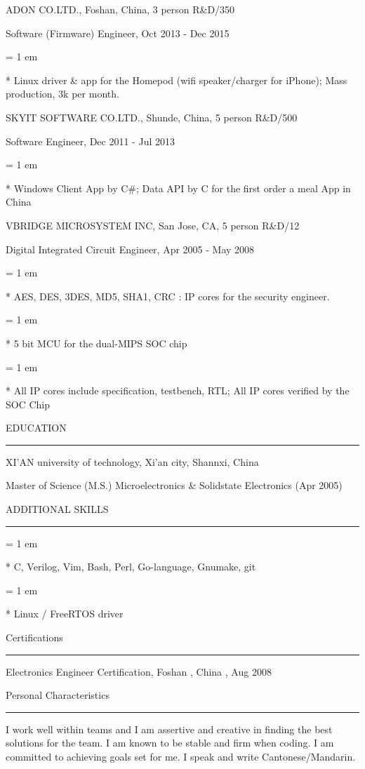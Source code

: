 { \medbreak } { \FFbg
ADON CO.LTD., Foshan, China, 3 person R\&D/350
}

{ \FFte
Software (Firmware) Engineer, Oct 2013 - Dec 2015
}
{ \parindent = 1 em \item{*} 
 Linux driver \& app for the Homepod (wifi speaker/charger for iPhone); Mass production, 3k per month.
 }

{ \medbreak } { \FFbg
SKYIT SOFTWARE CO.LTD., Shunde, China, 5 person R\&D/500
}

{ \FFte
Software Engineer, Dec 2011 - Jul 2013
}
{ \parindent = 1 em \item{*} 
 Windows Client App by C\#; Data API by C for the first order a meal App in China
 }

{ \medbreak } { \FFbg
VBRIDGE MICROSYSTEM INC, San Jose, CA, 5 person R\&D/12
}

{ \FFte
Digital Integrated Circuit Engineer, Apr 2005 - May 2008
}
{ \parindent = 1 em \item{*} 
 AES, DES, 3DES, MD5, SHA1, CRC : IP cores for the security engineer. 
 }
{ \parindent = 1 em \item{*} 
 5 bit MCU for the dual-MIPS SOC chip
 }
{ \parindent = 1 em \item{*} 
 All IP cores include specification, testbench, RTL; All IP cores verified by the SOC Chip
 }

{ \medbreak } { \FFbg
EDUCATION
}
{ \smallbreak } {\par\noindent\hrule} { \smallbreak }
XI'AN university of technology, Xi'an city, Shannxi, China

{ \FFte
Master of Science (M.S.) Microelectronics \& Solidstate Electronics (Apr 2005)
}

{ \medbreak } { \FFbg
ADDITIONAL SKILLS
}
{ \smallbreak } {\par\noindent\hrule} { \smallbreak }
{ \parindent = 1 em \item{*} 
 C, Verilog, Vim, Bash, Perl, Go-language, Gnumake, git
 }
{ \parindent = 1 em \item{*} 
 Linux / FreeRTOS driver
 }

{ \medbreak } { \FFbg
Certifications
}
{ \smallbreak } {\par\noindent\hrule} { \smallbreak }
Electronics Engineer Certification, Foshan , China , Aug 2008

{ \medbreak } { \FFbg
Personal Characteristics
}
{ \smallbreak } {\par\noindent\hrule} { \smallbreak }
I work well within teams and I am assertive and creative 
    in finding the best solutions for the team.
I am known to be stable and firm when coding.
I am committed to achieving goals set for me.
I speak and write 
Cantonese/Mandarin.


